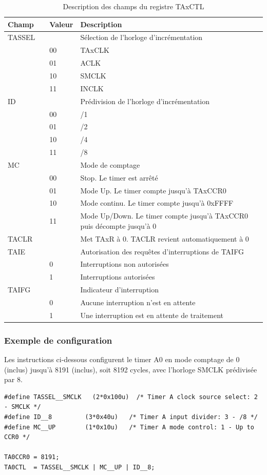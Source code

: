 \begin{table}[h]
\centering 
\begin{tabular}{l l l l}
\hline\hline
Champ & & Valeur & Description \\ %
\hline
TASSEL & & & Sélection de l'horloge d'incrémentation  \\
& & 00 & TAxCLK  \\
& & 01 & ACLK  \\
& & 10 & SMCLK  \\
& & 11 & INCLK  \\
\hline
ID & & & Prédivision de l'horloge d'incrémentation  \\
& & 00 & /1  \\
& & 01 & /2  \\
& & 10 & /4  \\
& & 11 & /8  \\
\hline
MC & & & Mode de comptage  \\
& & 00 & Stop. Le timer est arrêté  \\
& & 01 & Mode Up. Le timer compte jusqu'à TAxCCR0  \\
& & 10 & Mode continu. Le timer compte jusqu'à 0xFFFF  \\
& & 11 & Mode Up/Down. Le timer compte jusqu'à TAxCCR0 puis décompte jusqu'à 0  \\
\hline
TACLR & & & Met TAxR à 0. TACLR revient automatiquement à 0 \\
\hline
TAIE & & & Autorisation des requêtes d'interruptions de TAIFG \\
& & 0 & Interruptions non autorisées \\
& & 1 & Interruptions autorisées \\
\hline
TAIFG & & & Indicateur d'interruption \\
& & 0 & Aucune interruption n'est en attente \\
& & 1 & Une interruption est en attente de traitement \\
\hline
\end{tabular}
\caption{Description des champs du registre TAxCTL}
\label{table:TAxCTL}
\end{table}

\begin{minipage}{14cm}{
\subsubsection*{Exemple de configuration}
Les instructions ci-dessous configurent le timer A0 en mode comptage de 0 (inclus) jusqu'à 8191 (inclus), soit 8192 cycles, avec l'horloge SMCLK prédivisée par 8.

\lstset{style=customc}
\begin{lstlisting}
#define TASSEL__SMCLK	(2*0x100u)  /* Timer A clock source select: 2 - SMCLK */
#define ID__8         (3*0x40u)   /* Timer A input divider: 3 - /8 */
#define MC__UP        (1*0x10u)   /* Timer A mode control: 1 - Up to CCR0 */

TA0CCR0 = 8191;
TA0CTL  = TASSEL__SMCLK | MC__UP | ID__8;
\end{lstlisting}
}
\end{minipage}

